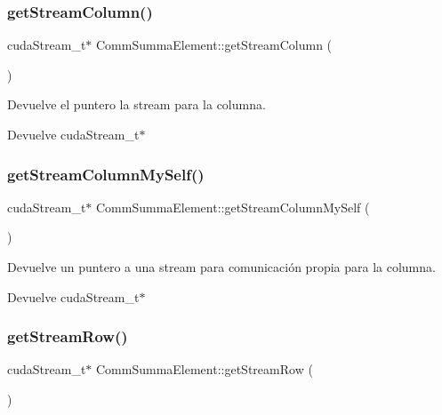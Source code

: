 \subsubsection{\texorpdfstring{get\+Stream\+Column()}{getStreamColumn()}}
{\footnotesize\ttfamily cuda\+Stream\+\_\+t$\ast$ Comm\+Summa\+Element\+::get\+Stream\+Column (\begin{DoxyParamCaption}{ }\end{DoxyParamCaption})}



Devuelve el puntero la stream para la columna. 

\begin{DoxyReturn}{Devuelve}
cuda\+Stream\+\_\+t$\ast$ 
\end{DoxyReturn}
\mbox{\label{classCommSummaElement_a0d766583f40c08ada84d080f7d8f83ea}} 
\subsubsection{\texorpdfstring{get\+Stream\+Column\+My\+Self()}{getStreamColumnMySelf()}}
{\footnotesize\ttfamily cuda\+Stream\+\_\+t$\ast$ Comm\+Summa\+Element\+::get\+Stream\+Column\+My\+Self (\begin{DoxyParamCaption}{ }\end{DoxyParamCaption})}



Devuelve un puntero a una stream para comunicación propia para la columna. 

\begin{DoxyReturn}{Devuelve}
cuda\+Stream\+\_\+t$\ast$ 
\end{DoxyReturn}
\mbox{\label{classCommSummaElement_a640cfe543eff74f51e8bf415175c5f83}} 
\subsubsection{\texorpdfstring{get\+Stream\+Row()}{getStreamRow()}}
{\footnotesize\ttfamily cuda\+Stream\+\_\+t$\ast$ Comm\+Summa\+Element\+::get\+Stream\+Row (\begin{DoxyParamCaption}{ }\end{DoxyParamCaption})}



